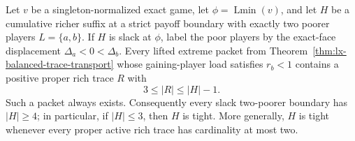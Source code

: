 \begin{theorem}
\label{thm:lx-rank-two-trace-exclusion}
Let $v$ be a singleton-normalized exact game, let
$\phi=\operatorname{Lmin}(v)$, and let $H$ be a cumulative richer suffix at
a strict payoff boundary with exactly two poorer players
$L=\{a,b\}$.  If $H$ is slack at $\phi$, label the poor players by the
exact-face displacement $\Delta_a<0<\Delta_b$.  Every lifted extreme packet
from Theorem~\ref{thm:lx-balanced-trace-transport} whose gaining-player load
satisfies $r_b<1$ contains a positive proper rich trace $R$ with
\[
 3\leq |R|\leq |H|-1.                                \tag{GH}
 \label{eq:lx-genuine-hypergraph-trace}
\]
Such a packet always exists.  Consequently every slack two-poorer boundary
has $|H|\geq4$; in particular, if $|H|\leq3$, then $H$ is tight.  More
generally, $H$ is tight whenever every proper active rich trace has
cardinality at most two.
\end{theorem}

